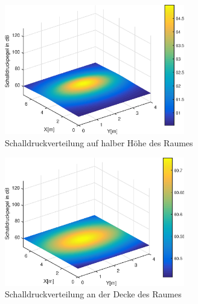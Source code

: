 \begin{figure}[H]
    \center
    \includegraphics[width = 0.7\textwidth]{figures/Schalldruckverteilung2}
    \caption{Schalldruckverteilung auf halber Höhe des Raumes}
    \label{fig:Schalldruckverteilung2}
\end{figure}

\begin{figure}[H]
    \center
    \includegraphics[width = 0.7\textwidth]{figures/Schalldruckverteilung3}
    \caption{Schalldruckverteilung an der Decke des Raumes}
    \label{fig:Schalldruckverteilung3}
\end{figure}



